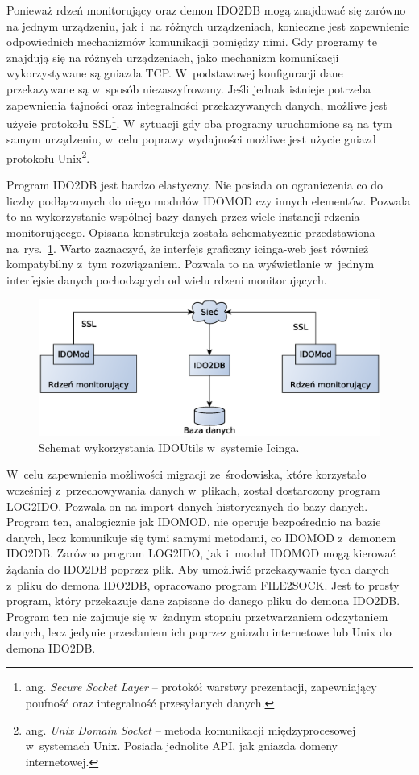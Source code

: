 Ponieważ rdzeń monitorujący oraz demon IDO2DB mogą znajdować się
zarówno na jednym urządzeniu, jak i~na różnych urządzeniach, konieczne
jest zapewnienie odpowiednich mechanizmów komunikacji pomiędzy nimi.
Gdy programy te znajdują się na różnych urządzeniach, jako mechanizm
komunikacji wykorzystywane są gniazda TCP. W~podstawowej konfiguracji
dane przekazywane są w~sposób niezaszyfrowany. Jeśli jednak istnieje
potrzeba zapewnienia tajności oraz integralności przekazywanych danych,
możliwe jest użycie protokołu SSL\footnote{ ang. {\em Secure Socket
    Layer} -- protokół warstwy prezentacji, zapewniający poufność oraz
  integralność przesyłanych danych.}. W~sytuacji gdy oba programy
uruchomione są na tym samym urządzeniu, w~celu poprawy wydajności
możliwe jest użycie gniazd protokołu Unix\footnote{ ang. {\em Unix
    Domain Socket} -- metoda komunikacji międzyprocesowej w~systemach
  Unix. Posiada jednolite API, jak gniazda domeny
  internetowej.}. 

Program IDO2DB jest bardzo elastyczny. Nie posiada on ograniczenia co
do liczby podłączonych do niego modułów IDOMOD czy innych
elementów. Pozwala to na wykorzystanie wspólnej bazy danych przez
wiele instancji rdzenia monitorującego. Opisana konstrukcja została
schematycznie przedstawiona na~rys.~\ref{fig:IDOUtils}. Warto
zaznaczyć, że interfejs graficzny icinga-web jest również kompatybilny
z~tym rozwiązaniem. Pozwala to na wyświetlanie w~jednym interfejsie
danych pochodzących od wielu rdzeni monitorujących.

\begin{figure}[ht]
  \caption{Schemat wykorzystania IDOUtils w~systemie Icinga.}
  \label{fig:IDOUtils}
\includegraphics[width=1\textwidth]{img/idoutils}
\end{figure}

W~celu zapewnienia możliwości migracji ze~środowiska, które korzystało
wcześniej z~przechowywania danych w~plikach, został dostarczony
program LOG2IDO. Pozwala on na import danych historycznych do bazy
danych. Program ten, analogicznie jak IDOMOD, nie operuje bezpośrednio
na bazie danych, lecz komunikuje się tymi samymi metodami, co IDOMOD
z~demonem IDO2DB. Zarówno program LOG2IDO, jak i~moduł IDOMOD mogą
kierować żądania do IDO2DB poprzez plik. Aby umożliwić przekazywanie
tych danych z~pliku do demona IDO2DB, opracowano program
FILE2SOCK. Jest to prosty program, który przekazuje dane zapisane do
danego pliku do demona IDO2DB. Program ten nie zajmuje się w~żadnym
stopniu przetwarzaniem odczytaniem danych, lecz jedynie przesłaniem
ich poprzez gniazdo internetowe lub Unix do demona IDO2DB.

